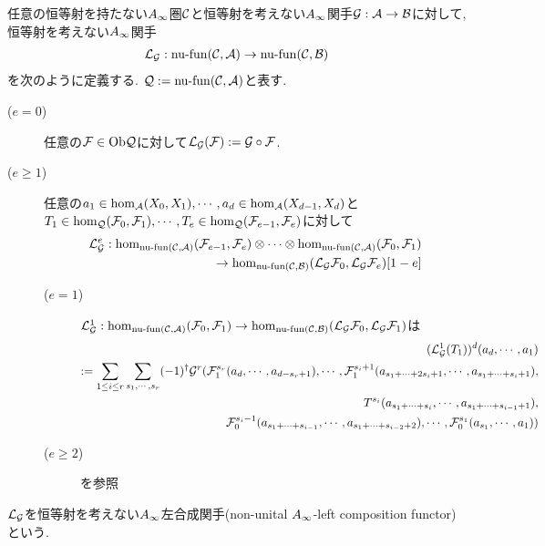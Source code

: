 \documentclass[uplatex, a4paper, 14Q, dvipdfmx]{jsarticle}
\begin{document}
\begin{definition}
  任意の恒等射を持たない$\Ainf$圏$\C$と恒等射を考えない$\Ainf$関手$\G : \A \to \B$に対して, 恒等射を考えない$\Ainf$関手
  \begin{align*}
    \LG : \nufun{\C}{\A} \to \nufun{\C}{\B} 
  \end{align*}
  を次のように定義する. 
  $\Q := \nufun{\C}{\A}$と表す. 
  \begin{description}
    \item[($e=0$)] 任意の$\F \in \Ob\Q$に対して$\LG(\F) := \G \circ \F $.
    \item[($e \geq 1$)] 任意の$a_1 \in \hom_\A(X_0,X_1), \cdots, a_d \in \hom_\A(X_{d-1},X_d)$と$T_1 \in \hom_\Q(\F_0,\F_1), \cdots, T_e \in \hom_\Q(\F_{e-1},\F_e)$に対して
    \begin{align*}
      \LG^e : \hom_{\nufun{\C}{\A}}(\F_{e-1},\F_e) \otimes \cdots \otimes \hom_{\nufun{\C}{\A}}(\F_0,\F_1) \\
      \to \hom_{\nufun{\C}{\B}}(\LG \F_0,\LG \F_e)[1-e]
    \end{align*}
    \begin{description}
      \item[($e=1$)] $\LG^1: \hom_{\nufun{\C}{\A}} (\F_0,\F_1) \to \hom_{\nufun{\C}{\B}} (\LG \F_0,\LG \F_1)$は
      \begin{align*}
        (\LG^1(T_1))^d(a_d,\cdots,a_1) \\
        := \sum_{1 \leq i \leq r} \sum_{s_1,\cdots,s_r} (-1)^\dagger \G^r (\F^{s_r}_1(a_d,\cdots,a_{d-s_r+1}), \cdots, \F^{s_i+1}_1(a_{s_1+\cdots+2s_i+1}, \cdots, a_{s_1+\cdots+s_i+1}), \\
        T^{s_i}(a_{s_1+\cdots+s_i}, \cdots, a_{s_1+\cdots+s_{i-1}+1}), \\
        \F^{s_i-1}_0(a_{s_1+\cdots+s_{i-1}}, \cdots, a_{s_1+\cdots+s_{i-2}+2}), \cdots, \F^{s_1}_0(a_{s_1},\cdots,a_1))
      \end{align*}
      \item[($e \geq 2$)] \cite{Fuk02}を参照
    \end{description}
  \end{description}
  $\LG$を恒等射を考えない$\Ainf$左合成関手(non-unital $\Ainf$-left composition functor)という. 
\end{definition}
\end{document}
